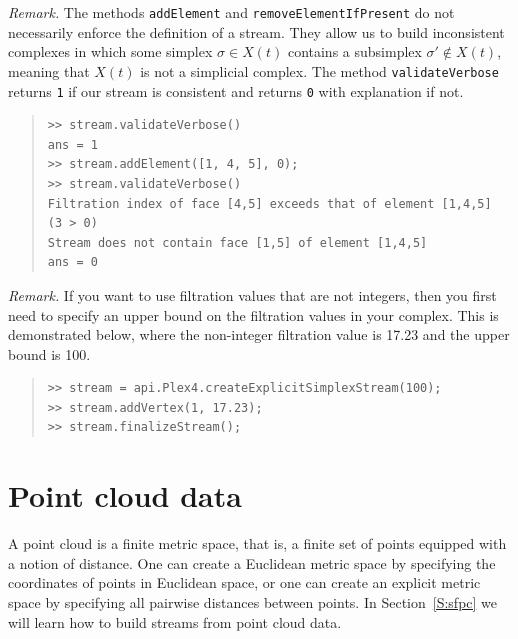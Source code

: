 \documentclass[amscd, amssymb, verbatim]{amsart}[12pt]
\theoremstyle{remark}
\theoremstyle{remark}
\theoremstyle{remark}
\begin{document}
{\em Remark.} The methods \texttt{addElement} and \texttt{removeElementIfPresent} do not necessarily enforce the definition of a stream. They allow us to build inconsistent complexes in which some simplex $\sigma \in X(t)$ contains a subsimplex $\sigma' \notin X(t)$, meaning that $X(t)$ is not a simplicial complex. The method \texttt{validateVerbose} returns \texttt{1} if our stream is consistent and returns \texttt{0} with explanation if not. 

\begin{quote} \begin{verbatim}
>> stream.validateVerbose()
ans = 1
>> stream.addElement([1, 4, 5], 0);
>> stream.validateVerbose()
Filtration index of face [4,5] exceeds that of element [1,4,5] (3 > 0)
Stream does not contain face [1,5] of element [1,4,5]
ans = 0
\end{verbatim} \end{quote}

{\em Remark.} If you want to use filtration values that are not integers, then you first need to specify an upper bound on the filtration values in your complex. This is demonstrated below, where the non-integer filtration value is 17.23 and the upper bound is 100.

\begin{quote} \begin{verbatim}
>> stream = api.Plex4.createExplicitSimplexStream(100);
>> stream.addVertex(1, 17.23);
>> stream.finalizeStream();
\end{verbatim} \end{quote}






\section{Point cloud data}

A point cloud is a finite metric space, that is, a finite set of points equipped with a notion of distance. One can create a Euclidean metric space by specifying the coordinates of points in Euclidean space, or one can create an explicit metric space by specifying all pairwise distances between points. In Section~\ref{S:sfpc} we will learn how to build streams from point cloud data. 
\end{document}
